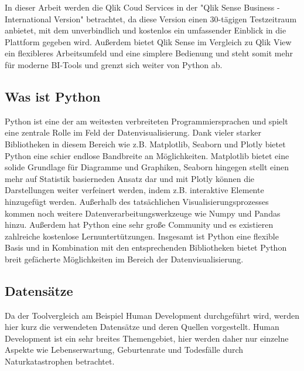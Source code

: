 \documentclass[12pt]{article}
\begin{document}
	In dieser Arbeit werden die Qlik Coud Services in der "Qlik Sense Business - International Version"  betrachtet, da diese Version einen 30-tägigen Testzeitraum anbietet, mit dem unverbindlich und kostenlos ein umfassender Einblick in die Plattform gegeben wird. Außerdem bietet Qlik Sense im Vergleich zu Qlik View ein flexibleres Arbeitsumfeld und eine simplere Bedienung und steht somit mehr für moderne BI-Tools und grenzt sich weiter von Python ab.
	
	\subsection{Was ist Python}
	Python ist eine der am weitesten verbreiteten Programmiersprachen und spielt eine zentrale Rolle im Feld der Datenvisualisierung. Dank vieler starker Bibliotheken in diesem Bereich wie z.B. Matplotlib, Seaborn und Plotly bietet Python eine schier endlose Bandbreite an Möglichkeiten. Matplotlib bietet eine solide Grundlage für Diagramme und Graphiken, Seaborn hingegen stellt einen mehr auf Statistik basierneden Ansatz dar und mit Plotly können die Darstellungen weiter verfeinert werden, indem z.B. interaktive Elemente hinzugefügt werden. Außerhalb des tatsächlichen Visualisierungsprozesses kommen noch weitere Datenverarbeitungswerkzeuge wie Numpy und Pandas hinzu. Außerdem hat Python eine sehr große Community und es existieren zahlreiche kostenlose Lernuntertützungen.
	Insgesamt ist Python eine flexible Basis und in Kombination mit den entsprechenden Bibliotheken bietet Python breit gefächerte Möglichkeiten im Bereich der Datenvisualisierung.
	
	\subsection{Datensätze}
	Da der Toolvergleich am Beispiel Human Development durchgeführt wird, werden hier kurz die verwendeten Datensätze und deren Quellen vorgestellt.
	Human Development ist ein sehr breites Themengebiet, hier werden daher nur einzelne Aspekte wie Lebenserwartung, Geburtenrate und Todesfälle durch Naturkatastrophen betrachtet.
	
\end{document}
